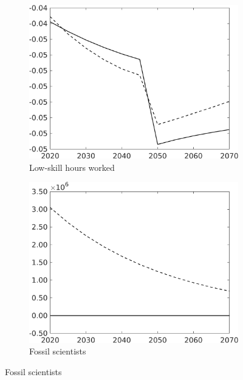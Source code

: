 \begin{figure}[h!!!]
\begin{subfigure}[]{0.4\textwidth}
	\end{subfigure}
	\begin{subfigure}[]{0.4\textwidth}
		\caption{Low-skill hours worked}
		\includegraphics[width=1\textwidth]{../../codding_model/own_basedOnFried/optimalPol_010922_revision/figures/all_13Sept22_Tplus30/hl_PercentageLFDyn_Target_regime4_knspil0_spillover0_noskill0_sep0_xgrowth0_PV1_etaa0.79_lgd0.png}
	\end{subfigure}
	\begin{subfigure}[]{0.4\textwidth}
		\caption{Fossil scientists}
		\includegraphics[width=1\textwidth]{../../codding_model/own_basedOnFried/optimalPol_010922_revision/figures/all_13Sept22_Tplus30/sff_PercentageLFDyn_Target_regime4_knspil0_spillover0_noskill0_sep0_xgrowth0_PV1_etaa0.79_lgd0.png}

\end{subfigure}
\end{figure}
